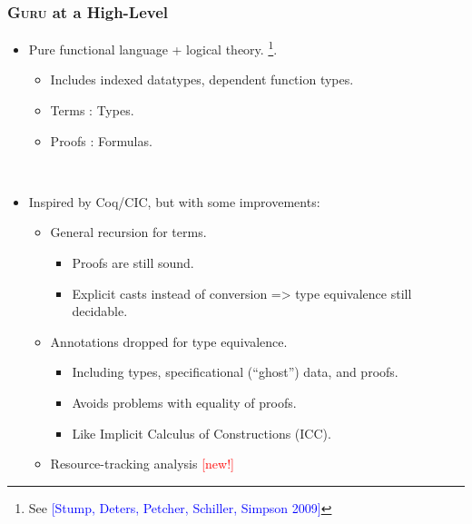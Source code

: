 \documentclass[10pt]{beamer}
\begin{document}
\begin{frame}[containsverbatim]
  \frametitle{\textsc{Guru} at a High-Level}

\begin{itemize}

\item Pure functional language + logical theory. \footnote{See \textcolor{blue}{[Stump, Deters, Petcher, Schiller, Simpson 2009]}}.
\begin{itemize}
\item Includes indexed datatypes, dependent function types.
\item Terms : Types.
\item Proofs : Formulas.
\end{itemize}

\ 

\item Inspired by Coq/CIC, but with some improvements:

\begin{itemize}
\item General recursion for terms.
\begin{itemize}
\item Proofs are still sound.
\item Explicit casts instead of conversion => type equivalence still decidable.
\end{itemize}

\item Annotations dropped for type equivalence.
\begin{itemize}
\item Including types, specificational (``ghost'') data, and proofs.
\item Avoids problems with equality of proofs.
\item Like Implicit Calculus of Constructions (ICC).
\end{itemize}

\item Resource-tracking analysis \textcolor{red}{[new!]}
\end{itemize}
\end{itemize}
\end{frame}
\end{document}
